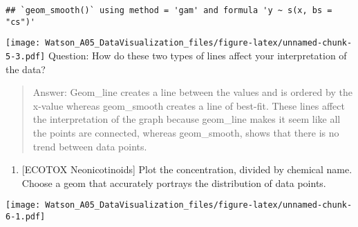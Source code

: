\documentclass[]{article}
\newenvironment{Shaded}{\begin{snugshade}}{\end{snugshade}}
\newcommand{\KeywordTok}[1]{\textcolor[rgb]{0.13,0.29,0.53}{\textbf{#1}}}
\newcommand{\DataTypeTok}[1]{\textcolor[rgb]{0.13,0.29,0.53}{#1}}
\newcommand{\DecValTok}[1]{\textcolor[rgb]{0.00,0.00,0.81}{#1}}
\newcommand{\StringTok}[1]{\textcolor[rgb]{0.31,0.60,0.02}{#1}}
\newcommand{\CommentTok}[1]{\textcolor[rgb]{0.56,0.35,0.01}{\textit{#1}}}
\newcommand{\OperatorTok}[1]{\textcolor[rgb]{0.81,0.36,0.00}{\textbf{#1}}}
\newcommand{\NormalTok}[1]{#1}
\providecommand{\tightlist}{%
  \setlength{\itemsep}{0pt}\setlength{\parskip}{0pt}}
\begin{document}
\begin{verbatim}
## `geom_smooth()` using method = 'gam' and formula 'y ~ s(x, bs = "cs")'
\end{verbatim}

\texttt{[image: Watson\_A05\_DataVisualization\_files/figure-latex/unnamed-chunk-5-3.pdf]}
Question: How do these two types of lines affect your interpretation of
the data?

\begin{quote}
Answer: Geom\_line creates a line between the values and is ordered by
the x-value whereas geom\_smooth creates a line of best-fit. These lines
affect the interpretation of the graph because geom\_line makes it seem
like all the points are connected, whereas geom\_smooth, shows that
there is no trend between data points.
\end{quote}

\begin{enumerate}
\def\labelenumi{\arabic{enumi}.}
\setcounter{enumi}{6}
\tightlist
\item
  {[}ECOTOX Neonicotinoids{]} Plot the concentration, divided by
  chemical name. Choose a geom that accurately portrays the distribution
  of data points.
\end{enumerate}

\begin{Shaded}
\end{Shaded}

\texttt{[image: Watson\_A05\_DataVisualization\_files/figure-latex/unnamed-chunk-6-1.pdf]}
\end{document}
